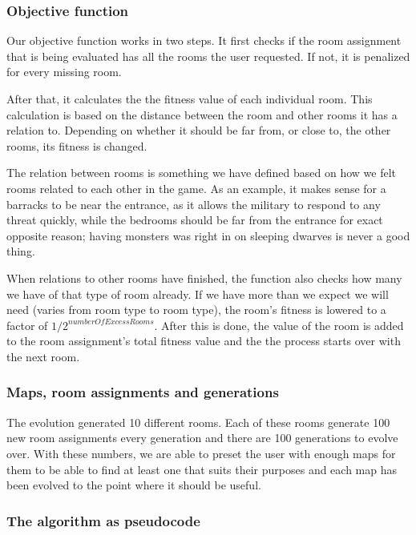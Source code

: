 \subsubsection{Objective function}

Our objective function works in two steps. It first checks if the room assignment that is being evaluated has all the rooms the user requested. If not, it is penalized for every missing room.

After that, it calculates the the fitness value of each individual room. This calculation is based on the distance between the room and other rooms it has a relation to. Depending on whether it should be far from, or close to, the other rooms, its fitness is changed. 

The relation between rooms is something we have defined based on how we felt rooms related to each other in the game. As an example, it makes sense for a barracks to be near the entrance, as it allows the military to respond to any threat quickly, while the bedrooms should be far from the entrance for exact opposite reason; having monsters was right in on sleeping dwarves is never a good thing.

When relations to other rooms have finished, the function also checks how many we have of that type of room already. If we have more than we expect we will need (varies from room type to room type), the room's fitness is lowered to a factor of $1 / 2^{numberOfExcessRooms}$. After this is done, the value of the room is added to the room assignment's total fitness value and the the process starts over with the next room.

\subsubsection{Maps, room assignments and generations}

The evolution generated 10 different rooms. Each of these rooms generate 100 new room assignments every generation and there are 100 generations to evolve over. With these numbers, we are able to preset the user with enough maps for them to be able to find at least one that suits their purposes and each map has been evolved to the point where it should be useful.

\subsubsection{The algorithm as pseudocode}

